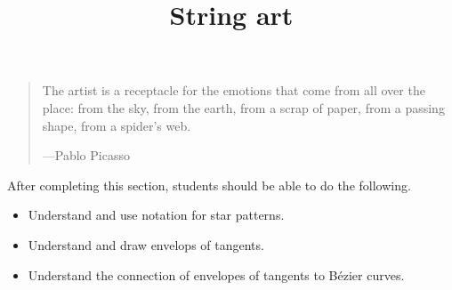 \documentclass{ximera}
\title{String art}
\begin{document}
\begin{abstract}
\end{abstract}
\maketitle

\begin{quote}
The artist is a receptacle for the emotions that come from all over
the place: from the sky, from the earth, from a scrap of paper, from a
passing shape, from a spider's web.

\hfill---Pablo Picasso
\end{quote}
After completing this section, students should be able to do the following.

\begin{itemize}
\item Understand and use notation for star patterns.
\item Understand and draw envelops of tangents.
\item Understand the connection of envelopes of tangents to B\'ezier curves.
\end{itemize}
\end{document}
